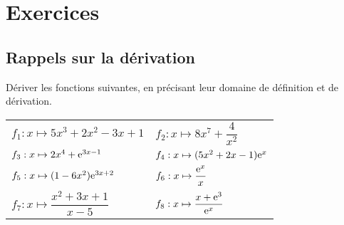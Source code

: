 \documentclass[11pt,fleqn]{book} %
\begin{document}
\chapter{Exercices}
\setcounter{section}{0}
\section*{Rappels sur la dérivation}

\begin{exercise}Dériver les fonctions suivantes, en précisant leur domaine de définition et de dérivation.

\renewcommand{\arraystretch}{2}
\begin{tabularx}{\linewidth}{XX}
 $f_1 : x \mapsto 5x^3+2x^2-3x+1$ &
$f_2 : x \mapsto 8x^7+\dfrac{4}{x^2}$ \\
 $f_3 : x \mapsto 2x^4 + \mathrm{e}^{3x-1}$ &
 $f_4 : x \mapsto (5x^2+2x-1)\mathrm{e}^x$ \\
$f_5 : x \mapsto (1-6x^2)\mathrm{e}^{3x+2}$ &
$f_6 : x \mapsto \dfrac{\mathrm{e}^x}{x}$ \\
$f_7 : x \mapsto \dfrac{x^2+3x+1}{x-5}$ &
$f_8 : x \mapsto \dfrac{x+\mathrm{e}^3}{\mathrm{e}^x}$
\end{tabularx}\end{exercise}
\end{document}

